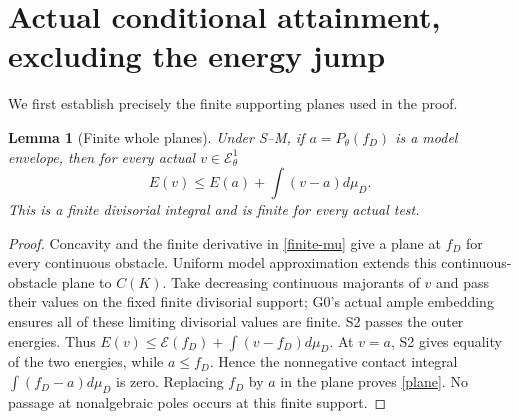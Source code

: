 \documentclass[10pt]{article}
\newtheorem{lemma}[theorem]{Lemma}
\newcommand{\E}{\mathcal E}
\begin{document}
\section{Actual conditional attainment, excluding the energy jump}
We first establish precisely the finite supporting planes used in the proof.

\begin{lemma}[Finite whole planes]\label{finite-plane}
Under S--M, if $a=P_\theta(f_D)$ is a model envelope, then for every
actual $v\in\E^1_\theta$
\begin{equation}\label{plane}
 E(v)\leq E(a)+\int(v-a)d\mu_D.
\end{equation}
This is a finite divisorial integral and is finite for every actual test.
\end{lemma}
\begin{proof}
Concavity and the finite derivative in \eqref{finite-mu} give a plane
at $f_D$ for every continuous obstacle. Uniform model approximation
extends this continuous-obstacle plane to $C(K)$.
Take decreasing continuous majorants of $v$ and pass their values
on the fixed finite divisorial support; G0's actual ample embedding
ensures all of these limiting divisorial values are finite.
S2 passes the outer energies. Thus
$E(v)\leq\mathscr E(f_D)+\int(v-f_D)d\mu_D$.
At $v=a$, S2 gives equality of the two energies, while $a\leq f_D$.
Hence the nonnegative contact integral $\int(f_D-a)d\mu_D$ is zero.
Replacing $f_D$ by $a$ in the plane proves \eqref{plane}.
No passage at nonalgebraic poles occurs at this finite support.
\end{proof}
\end{document}
